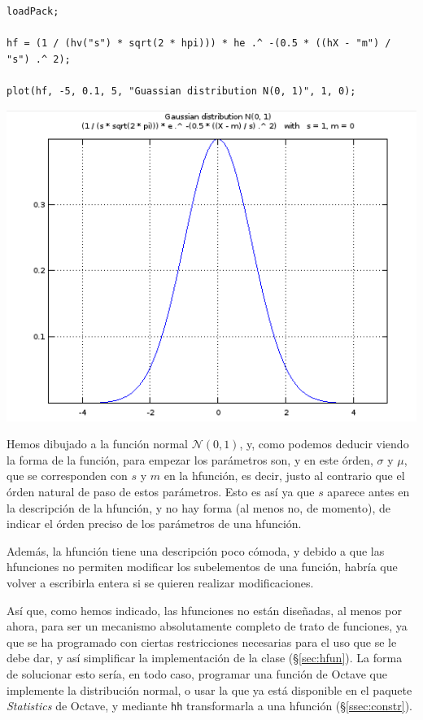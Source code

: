 \documentclass{article}
\newcommand{\refpar}[1]{\S\ref{#1}}
\begin{document}
\begin{verbatim}
loadPack;

hf = (1 / (hv("s") * sqrt(2 * hpi))) * he .^ -(0.5 * ((hX - "m") / "s") .^ 2);

plot(hf, -5, 0.1, 5, "Guassian distribution N(0, 1)", 1, 0);

\end{verbatim}

\begin{center}
\includegraphics[scale=0.5]{figure3.png}
\end{center}

Hemos dibujado a la función normal $\mathcal{N}(0, 1)$, y, como
podemos deducir viendo la forma de la función, para empezar los
parámetros son, y en este órden, $\sigma$ y $\mu$, que se corresponden
con $s$ y $m$ en la hfunción, es decir, justo al contrario que el
órden natural de paso de estos parámetros. Esto es así ya que $s$
aparece antes en la descripción de la hfunción, y no hay forma (al
menos no, de momento), de indicar el órden preciso de los parámetros
de una hfunción.

Además, la hfunción tiene una descripción poco cómoda, y
debido a que las hfunciones no permiten modificar los subelementos de
una función, habría que volver a escribirla entera si se quieren
realizar modificaciones.

Así que, como hemos indicado, las hfunciones no están diseñadas, al
menos por ahora, para ser un mecanismo absolutamente completo de trato
de funciones, ya que se ha programado con ciertas restricciones
necesarias para el uso que se le debe dar, y así simplificar la
implementación de la clase (\refpar{sec:hfun}). La forma de solucionar
esto sería, en todo caso, programar una función de Octave que
implemente la distribución normal, o usar la que ya está disponible en
el paquete \textit{Statistics} de Octave, y mediante \texttt{hh}
transformarla a una hfunción (\refpar{ssec:constr}).
\end{document}
